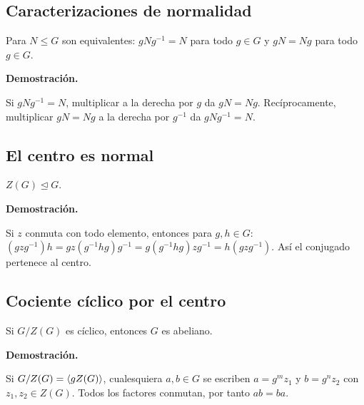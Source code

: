 \documentclass[11pt,a4paper]{article}
\begin{document}
\subsection{Caracterizaciones de normalidad}
\begin{resultado}
Para $N\le G$ son equivalentes: $gNg^{-1}=N$ para todo $g\in G$ y $gN=Ng$ para todo $g\in G$.
\end{resultado}
\textbf{Demostración.}
\begin{demostracion}
Si $gNg^{-1}=N$, multiplicar a la derecha por $g$ da $gN=Ng$. Recíprocamente, multiplicar $gN=Ng$ a la derecha por $g^{-1}$ da $gNg^{-1}=N$.
\end{demostracion}


\subsection{El centro es normal}
\begin{resultado}
$Z(G)\trianglelefteq G$.
\end{resultado}
\textbf{Demostración.}
\begin{demostracion}
Si $z$ conmuta con todo elemento, entonces para $g,h\in G$: $(gzg^{-1})h=gz(g^{-1}hg)g^{-1}=g(g^{-1}hg)zg^{-1}=h(gzg^{-1})$. Así el conjugado pertenece al centro.
\end{demostracion}


\subsection{Cociente cíclico por el centro}
\begin{resultado}
Si $G/Z(G)$ es cíclico, entonces $G$ es abeliano.
\end{resultado}
\textbf{Demostración.}
\begin{demostracion}
Si $G/Z(G)=\langle gZ(G)\rangle$, cualesquiera $a,b\in G$ se escriben $a=g^mz_1$ y $b=g^nz_2$ con $z_1,z_2\in Z(G)$. Todos los factores conmutan, por tanto $ab=ba$.
\end{demostracion}
\end{document}
